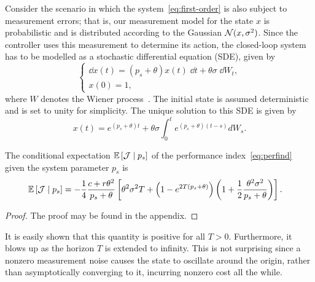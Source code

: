 Consider the scenario in which the system~\eqref{eq:first-order} is also subject
to measurement errors; that is, our measurement model for the state $x$ is
probabilistic and is distributed according to the Gaussian $\mathcal{N}(x,
\sigma^2)$. Since the controller uses this measurement to determine its action,
the closed-loop system has to be modelled as a stochastic differential equation
(SDE), given by
%
\begin{equation} \begin{cases} \dd x(t) =
(p_s+\theta)x(t) \; \dd t + \theta\sigma \; \dd W_t, \\ x(0) = 1,
\end{cases} \label{eq:first-order-SDE} \end{equation}
%
where $W$ denotes the Wiener process~\cite{evans2012introduction}. The initial
state is assumed deterministic and is set to unity for simplicity.  
% 
The unique solution to this SDE is given by
%
\begin{equation}
    x(t) = e^{(p_s+\theta)t} + \theta\sigma \int_0^t e^{(p_s+\theta)(t-s)}dW_s.
    \label{eq:sol-sde}
\end{equation}
%
\vspace{-4mm}
\begin{lem}\label{lem:1}
    The conditional expectation $\mathbb{E}\left[\mathcal{J}\mid p_s\right]$ of the
    performance index~\eqref{eq:perfind} given the system parameter $p_s$ is 
    \begin{align*} 
      \mathbb{E}\left[\mathcal{J} \mid p_s\right] &=-\frac{1}{4}\frac{c+r\theta^2}{p_s+\theta}
       \left[ \theta^2 \sigma^2 T + \left(1 - e^{2T(p_s+\theta)}\right) \left(1 +
      \frac{1}{2}\frac{\theta^2\sigma^2}{p_s+\theta}\right)\right].  
    \end{align*} 
\end{lem}
%

\begin{proof}
    The proof may be found in the appendix.
\end{proof}
%

%
It is easily shown that this quantity is positive for all $T>0$. Furthermore, it
blows up as the horizon $T$ is extended to infinity. This is not surprising
since a nonzero measurement noise causes the state to oscillate around the
origin, rather than asymptotically converging to it, incurring nonzero cost
all the while.


